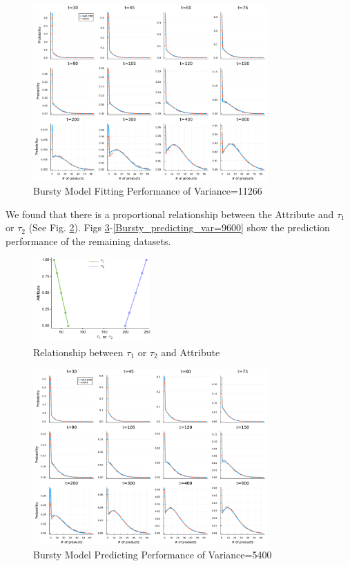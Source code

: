 \documentclass[a4paper,10pt]{article}
\begin{document}
\begin{figure}[h]
	\centering
	\includegraphics[width=0.8\textwidth]{Figs/fit_var=11266.pdf}
	\caption{Bursty Model Fitting Performance of Variance=11266}\label{Bursty_fitting_var=11266}  
\end{figure}
We found that there is a proportional relationship between the Attribute and $\tau_1$ or $\tau_2$ (See Fig. \ref{T1orT2_Attribute}). Figs \ref{Bursty_predicting_var=5400}-\ref{Bursty_predicting_var=9600} show the prediction performance of the remaining datasets.
\begin{figure}[h]
	\centering
	\includegraphics[width=0.4\textwidth]{Figs/T1orT2_Attribute.pdf}
	\caption{Relationship between $\tau_1$ or $\tau_2$ and Attribute}\label{T1orT2_Attribute}  
\end{figure}
\begin{figure}[h]
	\centering
	\includegraphics[width=0.8\textwidth]{Figs/predict_var=5400.pdf}
	\caption{Bursty Model Predicting Performance of Variance=5400}\label{Bursty_predicting_var=5400}  
\end{figure}
\end{document}
